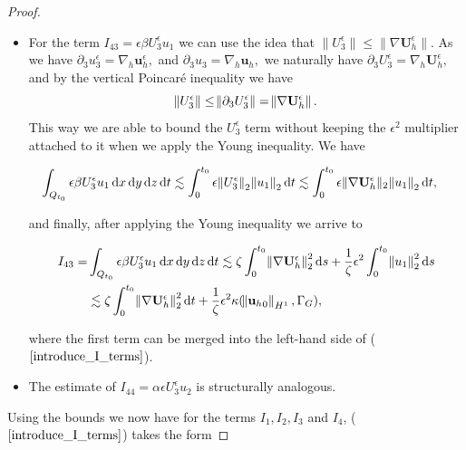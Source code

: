 \documentclass[12pt]{report}
\numberwithin{theorem}{chapter}
\numberwithin{corollary}{chapter}
\numberwithin{lemma}{chapter}
\numberwithin{remark}{chapter}
\numberwithin{definition}{chapter}
\numberwithin{prop}{chapter}
\newcommand*\diff{\mathop{}\!\mathrm{d}}
\begin{document}
\begin{proof}
\begin{itemize}
      \item For the term $ I_{43} = \epsilon \beta U_3^\epsilon u_1$ we can use the idea that $\| U_3^\epsilon \| \leq \| \nabla \mathbf{U}_h^\epsilon \|.$ As we have $\partial_3 u_3^\epsilon = \nabla_h \mathbf{u}_h^\epsilon,$ and $\partial_3 u_3 = \nabla_h \mathbf{u}_h,$ we naturally have $\partial_3 U_3^\epsilon = \nabla_h \mathbf{U}_h^\epsilon,$ and by the vertical Poincar\'e inequality we have $$\norm{U_3^\epsilon} \leq \norm{\partial_3 U_3^\epsilon} = \norm{\nabla \mathbf{U}_h^\epsilon}.$$ This way we are able to bound the $U_3^\epsilon$ term without keeping the $\epsilon^2$ multiplier attached to it when we apply the Young inequality. We have
      
      $$ \hspace{-1em}\int_{Q_{t_0}} \epsilon \beta U_3^\epsilon u_1 \diff x \diff y \diff z \diff t \lesssim \int_0^{t_0} \epsilon \norm{U_3^\epsilon}_2 \norm{u_1}_2 \diff t \lesssim \int_0^{t_0} \epsilon \| \nabla \mathbf{U}_h^\epsilon \|_2 \norm{u_1}_2 \diff t, $$
      
      and finally, after applying the Young inequality we arrive to
      
      \begin{equation}
        \begin{split}
          I_{43} = & \int_{Q_{t_0}} \epsilon \beta U_3^\epsilon u_1 \diff x \diff y \diff z \diff t \lesssim \zeta \int_0^{t_0} \norm{\nabla \mathbf{U}_h^\epsilon}_2^2 \diff s+ \frac{1}{\zeta} \epsilon^2 \int_0^{t_0} \norm{u_1}_2^2 \diff s \\
          & \lesssim \zeta \int_0^{t_0} \norm{\nabla \mathbf{U}_h^\epsilon}_2^2 \diff t + \frac{1}{\zeta} \epsilon^2 \kappa (\norm{{\mathbf{u}_h}_0}_{H^1}, \Gamma_G),
        \end{split}
      \end{equation}
      
      where the first term can be merged into the left-hand side of ($\ref{introduce_I_terms}$).
            
      \item The estimate of $ I_{44} = \alpha \epsilon U_3^\epsilon u_2$ is structurally analogous.
    
    \end{itemize}
    
Using the bounds we now have for the terms $I_1, I_2, I_3$ and $I_4$, ($\ref{introduce_I_terms}$) takes the form


\end{proof}
\end{document}
